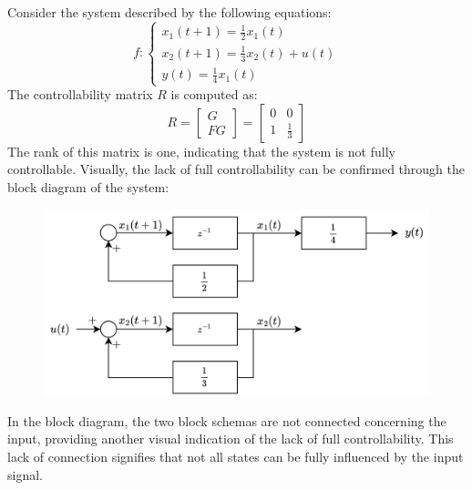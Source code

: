 \begin{example}
    Consider the system described by the following equations:
    \[f:\begin{cases}
        x_1(t+1)=\frac{1}{2}x_1(t) \\
        x_2(t+1)=\frac{1}{3}x_2(t)+u(t) \\
        y(t)=\frac{1}{4}x_1(t)
    \end{cases}\]
    The controllability matrix $R$ is computed as:
    \[R=\begin{bmatrix} G \\ FG \end{bmatrix}=\begin{bmatrix} 0 & 0 \\ 1 & \frac{1}{3} \end{bmatrix}\]
    The rank of this matrix is one, indicating that the system is not fully controllable.
    Visually, the lack of full controllability can be confirmed through the block diagram of the system:
    \begin{figure}[H]
        \centering
        \includegraphics[width=0.6\linewidth]{images/block1.png}
    \end{figure}
    In the block diagram, the two block schemas are not connected concerning the input, providing another visual indication of the lack of full controllability. 
    This lack of connection signifies that not all states can be fully influenced by the input signal.
\end{example}

